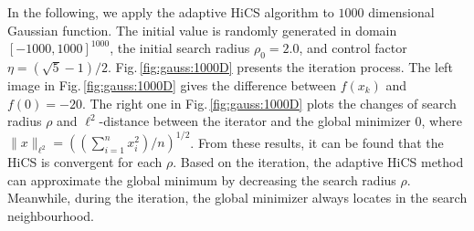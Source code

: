 \documentclass[final,1p,times]{elsarticle}
\begin{document}
In the following, we apply the adaptive HiCS algorithm to $1000$ dimensional
Gaussian function. The initial value is randomly generated in
domain $[-1000,1000]^{1000}$, the initial search radius $\rho_0 = 2.0$,
and control factor $\eta=(\sqrt{5}-1)/2$. 
Fig.\,\ref{fig:gauss:1000D} presents the iteration process.
The left image in Fig.\,\ref{fig:gauss:1000D} gives
the difference between $f(x_k)$ and $f(0)=-20$. 
The right one in Fig.\,\ref{fig:gauss:1000D} 
plots the changes of search radius $\rho$ and $\ell^2$-distance between
the iterator and the global minimizer $0$, where $\|x\|_{\ell^2}=\left(
(\sum_{i=1}^n x_i^2) / n\right)^{1/2}$.
From these results, it can be found that the HiCS is convergent
for each $\rho$. Based on the iteration, the adaptive HiCS method
can approximate the global minimum by decreasing the search radius $\rho$. 
Meanwhile, during the iteration, the global minimizer always locates in the
search neighbourhood. 
\end{document}

